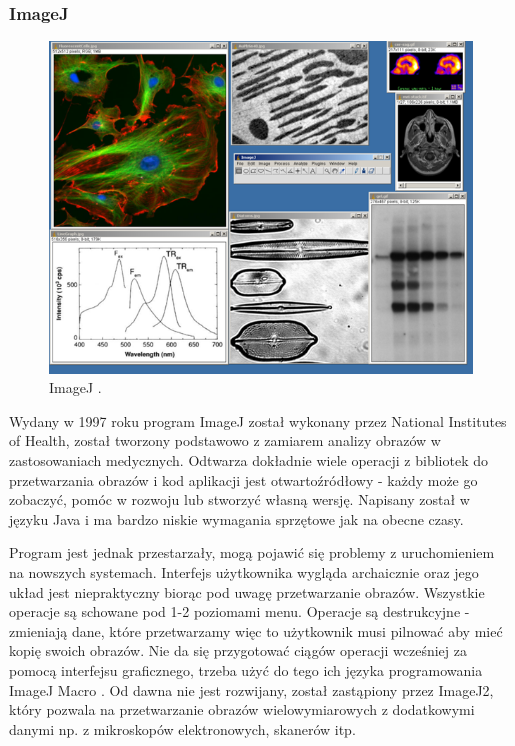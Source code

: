 \subsubsection{ImageJ}
\begin{figure}[H]
    \centering
    \includegraphics[width=0.8\linewidth]{./images/Picture3.png}
    \caption{ImageJ \cite{imagej}.}
    \label{fig:imagej}
\end{figure}

Wydany w 1997 roku program ImageJ został wykonany przez National Institutes of Health, został tworzony podstawowo z zamiarem analizy obrazów w zastosowaniach medycznych. 
Odtwarza dokładnie wiele operacji z bibliotek do przetwarzania obrazów i kod aplikacji jest otwartoźródłowy - każdy może go zobaczyć, pomóc w rozwoju lub stworzyć własną wersję. 
Napisany został w języku Java i ma bardzo niskie wymagania sprzętowe jak na obecne czasy.

Program jest jednak przestarzały, mogą pojawić się problemy z uruchomieniem na nowszych systemach. Interfejs użytkownika wygląda archaicznie oraz jego układ jest niepraktyczny biorąc pod uwagę przetwarzanie obrazów. 
Wszystkie operacje są schowane pod 1-2 poziomami menu. 
Operacje są destrukcyjne - zmieniają dane, które przetwarzamy więc to użytkownik musi pilnować aby mieć kopię swoich obrazów. 
Nie da się przygotować ciągów operacji wcześniej za pomocą interfejsu graficznego, trzeba użyć do tego ich języka programowania ImageJ Macro \cite{imagejbatch}. 
Od dawna nie jest rozwijany, został zastąpiony przez ImageJ2, który pozwala na przetwarzanie obrazów wielowymiarowych z dodatkowymi danymi np. z mikroskopów elektronowych, skanerów itp.

